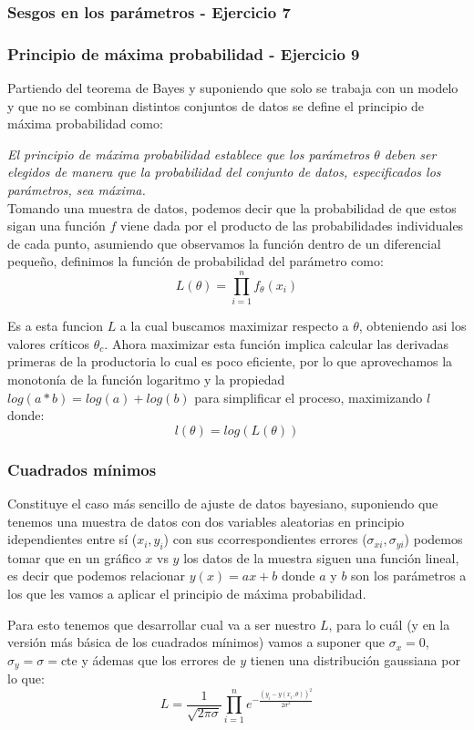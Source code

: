 \documentclass[twocolumn]{article}
\begin{document}
\subsubsection{Sesgos en los parámetros - Ejercicio 7}


\subsubsection{Principio de máxima probabilidad - Ejercicio 9}
Partiendo del teorema de Bayes y suponiendo que solo se trabaja con un modelo y que no se combinan distintos conjuntos de datos se define el principio de máxima probabilidad como:

\textit{El principio de máxima probabilidad establece que los parámetros 
$\theta$ deben ser elegidos de manera que la probabilidad del conjunto de datos, especificados los parámetros, sea máxima.}
\\
Tomando una muestra de datos, podemos decir que la probabilidad de que estos sigan una función $f$ viene dada por el producto de las probabilidades individuales de cada punto, asumiendo que observamos la función dentro de un diferencial pequeño, definimos la función de probabilidad del parámetro como:
\[
L\left( \theta  \right)
= \prod_{i=1}^{n} f_{\theta}(x_i)
\]

Es a esta funcion $L$ a la cual buscamos maximizar respecto a $\theta$, obteniendo asi los valores críticos $\theta_c$. Ahora maximizar esta función implica calcular las derivadas primeras de la productoria lo cual es poco eficiente, por lo que aprovechamos la monotonía de la función logaritmo y la propiedad $log(a*b)=log(a)+log(b)$ para simplificar el proceso, maximizando $l$ donde:
\[
l\left( \theta  \right)
= log(L(\theta))
\]


\subsubsection{Cuadrados mínimos}
Constituye el caso más sencillo de ajuste de datos bayesiano, suponiendo que tenemos una muestra de datos con dos variables aleatorias en principio idependientes entre sí ($x_i,y_i$) con sus ccorrespondientes errores ($\sigma_{xi},\sigma_{yi}$) podemos tomar que en un gráfico $x$ vs $y$ los datos de la muestra siguen una función lineal, es decir que podemos relacionar $y(x)=ax+b$ donde $a$ y $b$ son los parámetros a los que les vamos a aplicar el principio de máxima probabilidad.

Para esto tenemos que desarrollar cual va a ser nuestro $L$, para lo cuál (y en la versión más básica de los cuadrados mínimos) vamos a suponer que $\sigma_x=0$, $\sigma_y=\sigma= \text{cte}$ y ádemas que los errores de $y$ tienen una distribución gaussiana por lo que:
\begin{equation}
L = \frac{1}{\sqrt{2\pi\sigma}}\prod_{i=1}^n e^{-\frac{(y_i-y(x_i,\theta))^2}{2\sigma^2}}
\end{equation}
\end{document}
